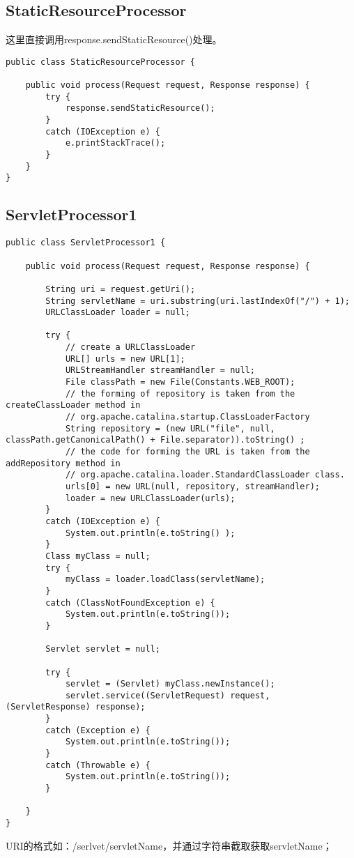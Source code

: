 \subsection{StaticResourceProcessor}
这里直接调用response.sendStaticResource()处理。
\begin{lstlisting}
public class StaticResourceProcessor {
	
	public void process(Request request, Response response) {
		try {
			response.sendStaticResource();
		}
		catch (IOException e) {
			e.printStackTrace();
		}
	}
}
\end{lstlisting}
\subsection{ServletProcessor1}
\begin{lstlisting}
public class ServletProcessor1 {
	
	public void process(Request request, Response response) {
		
		String uri = request.getUri();
		String servletName = uri.substring(uri.lastIndexOf("/") + 1);
		URLClassLoader loader = null;
		
		try {
			// create a URLClassLoader
			URL[] urls = new URL[1];
			URLStreamHandler streamHandler = null;
			File classPath = new File(Constants.WEB_ROOT);
			// the forming of repository is taken from the createClassLoader method in
			// org.apache.catalina.startup.ClassLoaderFactory
			String repository = (new URL("file", null, classPath.getCanonicalPath() + File.separator)).toString() ;
			// the code for forming the URL is taken from the addRepository method in
			// org.apache.catalina.loader.StandardClassLoader class.
			urls[0] = new URL(null, repository, streamHandler);
			loader = new URLClassLoader(urls);
		}
		catch (IOException e) {
			System.out.println(e.toString() );
		}
		Class myClass = null;
		try {
			myClass = loader.loadClass(servletName);
		}
		catch (ClassNotFoundException e) {
			System.out.println(e.toString());
		}
		
		Servlet servlet = null;
		
		try {
			servlet = (Servlet) myClass.newInstance();
			servlet.service((ServletRequest) request, (ServletResponse) response);
		}
		catch (Exception e) {
			System.out.println(e.toString());
		}
		catch (Throwable e) {
			System.out.println(e.toString());
		}
		
	}
}
\end{lstlisting}
URI的格式如：/serlvet/servletName，并通过字符串截取获取servletName；\\
